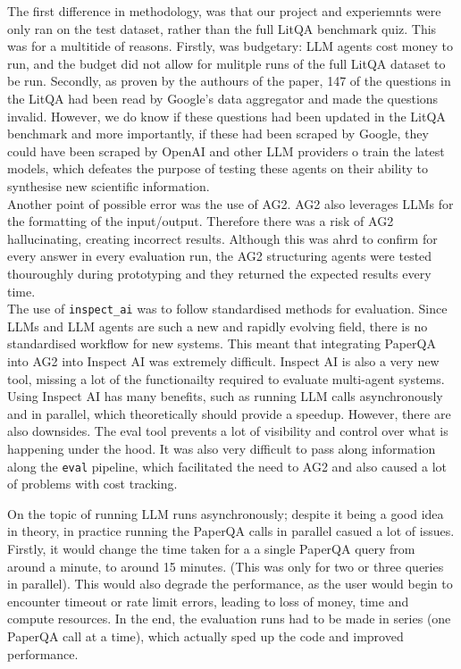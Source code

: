 The first difference in methodology, was that our project and experiemnts were only ran on the test dataset, rather than the full LitQA benchmark quiz. This was for a multitide of reasons. Firstly, was budgetary: LLM agents cost money to run, and the budget did not allow for mulitple runs of the full LitQA dataset to be run. Secondly, as proven by the authours of the paper, 147 of the questions in the LitQA had been read by Google's data aggregator and made the questions invalid. However, we do know if these questions had been updated in the LitQA benchmark and more importantly, if these had been scraped by Google, they could have been scraped by OpenAI and other LLM providers o train the latest models, which defeates the purpose of testing these agents on their ability to synthesise new scientific information. \\

Another point of possible error was the use of AG2. AG2 also leverages LLMs for the formatting of the input/output. Therefore there was a risk of AG2 hallucinating, creating incorrect results. Although this was ahrd to confirm for every answer in every evaluation run, the AG2 structuring agents were tested thouroughly during prototyping and they returned the expected results every time.\\

The use of \texttt{inspect\_ai} was to follow standardised methods for evaluation. Since LLMs and LLM agents are such a new and rapidly evolving field, there is no standardised workflow for new systems. This meant that integrating PaperQA into AG2 into Inspect AI was extremely difficult. Inspect AI is also a very new tool, missing a lot of the functionailty required to evaluate multi-agent systems. Using Inspect AI has many benefits, such as running LLM calls asynchronously and in parallel, which theoretically should provide a speedup. However, there are also downsides. The eval tool prevents a lot of visibility and control over what is happening under the hood. It was also very difficult to pass along information along the \texttt{eval} pipeline, which facilitated the need to AG2 and also caused a lot of problems with cost tracking.

On the topic of running LLM runs asynchronously; despite it being a good idea in theory, in practice running the PaperQA calls in parallel casued a lot of issues. Firstly, it would change the time taken for a a single PaperQA query from around a minute, to around 15 minutes. (This was only for two or three queries in parallel). This would also degrade the performance, as the user would begin to encounter timeout or rate limit errors, leading to loss of money, time and compute resources. In the end, the evaluation runs had to be made in series (one PaperQA call at a time), which actually sped up the code and improved performance. \\

